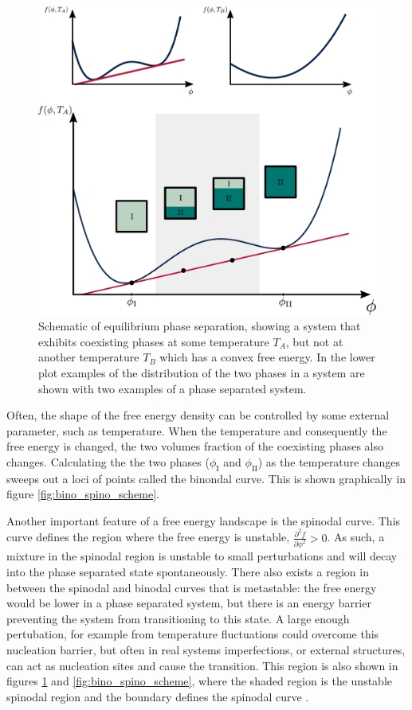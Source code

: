 \begin{figure}
    \centering
    \includegraphics[width=\textwidth]{figures/thermo_solutions.pdf}
    \caption{Schematic of equilibrium phase separation, showing a system that exhibits coexisting phases at some temperature $T_{A}$, but not at another temperature $T_{B}$ which has a convex free energy. In the lower plot examples of the distribution of the two phases in a system are shown with two examples of a phase separated system.}
    \label{fig:phase_sep_scheme}
\end{figure}

Often, the shape of the free energy density can be controlled by some external parameter, such as temperature. When the temperature and consequently the free energy is changed, the two volumes fraction of the coexisting phases also changes. Calculating the the two phases ($\phi_{\mathrm{I}}$ and $\phi_{\mathrm{II}}$) as the temperature changes sweeps out a loci of points called the binondal curve. This is shown graphically in figure \ref{fig:bino_spino_scheme}.

Another important feature of a free energy landscape is the spinodal curve. This curve defines the region where the free energy is unstable, $\frac{\partial^2 f}{\partial \phi^2} > 0$. As such, a mixture in the spinodal region is unstable to small perturbations and will decay into the phase separated state spontaneously. There also exists a region in between the spinodal and binodal curves that is metastable: the free energy would be lower in a phase separated system, but there is an energy barrier preventing the system from transitioning to this state. A large enough pertubation, for example from temperature fluctuations could overcome this nucleation barrier, but often in real systems imperfections, or external structures, can act as nucleation sites and cause the transition. This region is also shown in figures \ref{fig:phase_sep_scheme} and \ref{fig:bino_spino_scheme}, where the shaded region is the unstable spinodal region and the boundary defines the spinodal curve \cite{jones2002soft}.

